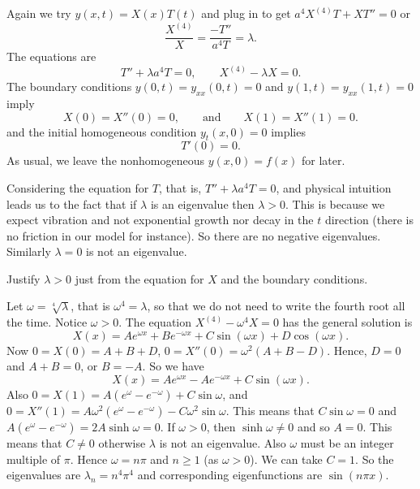 \documentclass{ximera}
\begin{document}
Again we try $y(x,t) = X(x)T(t)$ and plug in to get $a^4 X^{(4)}T + XT'' = 0$ or 
\begin{equation*}
    \frac{X^{(4)}}{X} = \frac{- T''}{a^4T} = \lambda .
\end{equation*}
The equations are
\begin{equation*}
    T'' + \lambda a^4 T = 0, \qquad X^{(4)} - \lambda X = 0 .
\end{equation*}
The boundary conditions $y(0,t) = y_{xx}(0,t) = 0$ and $y(1,t) = y_{xx}(1,t) = 0$ imply
\begin{equation*}
    X(0) =  X''(0) = 0, \qquad \text{and} \qquad X(1) =  X''(1) = 0 .
\end{equation*}
and the initial homogeneous condition $y_t(x,0) = 0$ implies
\begin{equation*}
    T'(0) = 0 .
\end{equation*}
As usual, we leave the nonhomogeneous $y(x,0) = f(x)$ for later.

Considering the equation for $T$, that is, $T'' + \lambda a^4 T = 0$, and physical intuition leads us to the fact that if $\lambda$ is an eigenvalue then $\lambda > 0$. This is because we expect vibration and not exponential growth nor decay in the $t$ direction (there is no friction in our model for instance). So there are no negative eigenvalues. Similarly $\lambda = 0$ is not an eigenvalue.

\begin{exercise}
    Justify $\lambda > 0$ just from the equation for $X$ and the boundary conditions.
\end{exercise}

Let $\omega = \sqrt[4]{\lambda}$, that is $\omega^4 = \lambda$, so that we do not need to write the fourth root all the time.  Notice $\omega > 0$. The equation $X^{(4)} - \omega^4 X = 0$ has the general solution is
\begin{equation*}
    X(x) = A e^{\omega x} + B e^{-\omega x} + C \sin (\omega x) + D \cos (\omega x) .
\end{equation*}
Now $0 = X(0) = A+B+D$, $0 = X''(0) = \omega^2 (A + B - D)$.  Hence, $D = 0$ and $A+B = 0$, or $B = - A$.  So we have
\begin{equation*}
    X(x) = A e^{\omega x} - A e^{-\omega x} + C \sin (\omega x) .
\end{equation*}
Also $0 = X(1) = A (e^{\omega} - e^{-\omega}) + C \sin \omega$, and $0 = X''(1) = A \omega^2 (e^{\omega} - e^{-\omega}) - C \omega^2 \sin \omega$. This means that $C \sin \omega  = 0$ and $A (e^{\omega} - e^{-\omega}) = 2 A \sinh \omega = 0$.  If $\omega > 0$, then $\sinh \omega \not= 0$ and so $A = 0$.  This means that $C \not=0$ otherwise $\lambda$ is not an eigenvalue.  Also $\omega$ must be an integer multiple of $\pi$.   Hence $\omega = n \pi$ and $n \geq 1$ (as $\omega > 0$).  We can take $C=1$.  So the eigenvalues are $\lambda_n = n^4 \pi^4$ and corresponding eigenfunctions are $\sin (n \pi x)$.
\end{document}
